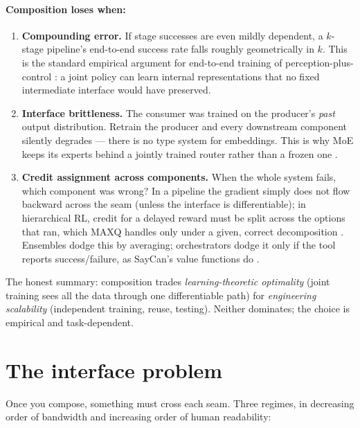 \documentclass[11pt]{article}
\begin{document}
\paragraph{Composition loses when:}
\begin{enumerate}[noitemsep]
  \item \textbf{Compounding error.} If stage successes are even mildly dependent, a $k$-stage pipeline's end-to-end success rate falls roughly geometrically in $k$. This is the standard empirical argument for end-to-end training of perception-plus-control \cite{levine2016end}: a joint policy can learn internal representations that no fixed intermediate interface would have preserved.
  \item \textbf{Interface brittleness.} The consumer was trained on the producer's \emph{past} output distribution. Retrain the producer and every downstream component silently degrades --- there is no type system for embeddings. This is why MoE keeps its experts behind a jointly trained router rather than a frozen one \cite{shazeer2017sparsely}.
  \item \textbf{Credit assignment across components.} When the whole system fails, which component was wrong? In a pipeline the gradient simply does not flow backward across the seam (unless the interface is differentiable); in hierarchical RL, credit for a delayed reward must be split across the options that ran, which MAXQ handles only under a given, correct decomposition \cite{dietterich2000maxq}. Ensembles dodge this by averaging; orchestrators dodge it only if the tool reports success/failure, as SayCan's value functions do \cite{ahn2022saycan}.
\end{enumerate}

The honest summary: composition trades \emph{learning-theoretic optimality} (joint training sees all the data through one differentiable path) for \emph{engineering scalability} (independent training, reuse, testing). Neither dominates; the choice is empirical and task-dependent.

\section{The interface problem}
\label{sec:interface}
Once you compose, something must cross each seam. Three regimes, in decreasing order of bandwidth and increasing order of human readability:
\end{document}
